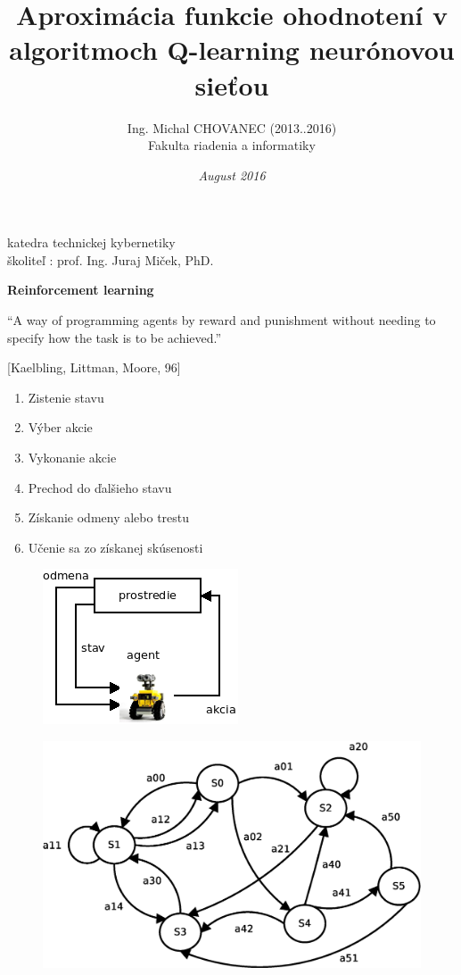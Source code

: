 \documentclass[xcolor=dvipsnames]{beamer}
\title{\bf Aproximácia funkcie ohodnotení v algoritmoch Q-learning neurónovou sieťou}
\author{Ing. Michal CHOVANEC (2013..2016) \\Fakulta riadenia a informatiky}
\date[EURP]{\it August 2016}
\begin{document}
\begin{frame}
\titlepage
katedra technickej kybernetiky \\
školiteľ : prof. Ing. Juraj Miček, PhD.
\end{frame}



\begin{frame}{\bf Reinforcement learning}

“A way of programming agents by reward and
punishment without needing to specify how the
task is to be achieved.”

[Kaelbling, Littman, Moore, 96]

\begin{minipage}{.5\textwidth}

\begin{enumerate}
  \item Zistenie stavu
  \item Výber akcie
  \item Vykonanie akcie
  \item Prechod do ďalšieho stavu
  \item Získanie odmeny alebo trestu
  \item Učenie sa zo získanej skúsenosti
\end{enumerate}

  \end{minipage}%
\begin{minipage}{.5\textwidth}

  \begin{figure}[!htb]
  \centering
  \includegraphics[scale=.4]{../diagrams/agent.png}
  \end{figure}

  \begin{figure}[!htb]
  \centering
  \includegraphics[scale=.2]{../diagrams/markovov_process.eps}
  \end{figure}


\end{minipage}
\end{frame}
\end{document}
